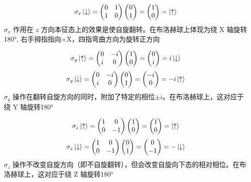 \[
\sigma_{x}\ket{\downarrow} = \begin{pmatrix}
	0 & 1 \\
	1 & 0
\end{pmatrix} \begin{pmatrix}
	0 \\
	1
\end{pmatrix} = \begin{pmatrix}
	1 \\
	0
\end{pmatrix} = \ket{\uparrow}
\]
$\sigma_{x}$ 作用在 $z$ 方向本征态上的效果是使自旋翻转。在布洛赫球上体现为绕 X 轴​旋转 180°, 右手拇指指向+X，四指弯曲方向为旋转正方向\par
\[
\sigma_{y}\ket{\uparrow} = \begin{pmatrix}0 & -i\\ i & 0\end{pmatrix}\begin{pmatrix}1\\0\end{pmatrix}=\begin{pmatrix}0\\ i\end{pmatrix}=i\ket{\downarrow}
\]
\[
\sigma_{y}\ket{\downarrow} = \begin{pmatrix}0 & -i\\ i & 0\end{pmatrix}\begin{pmatrix}0\\1\end{pmatrix}=\begin{pmatrix}-i\\0\end{pmatrix}=-i\ket{\uparrow}
\]
\(\sigma_y\) 操作在翻转自旋方向的同时，附加了特定的相位\(\pm i\)。在布洛赫球上，这对应于绕 Y 轴旋转180°

\[
\sigma_{z}\ket{\uparrow} = \begin{pmatrix}1 & 0\\0 & -1\end{pmatrix}\begin{pmatrix}1\\0\end{pmatrix}=\begin{pmatrix}1\\0\end{pmatrix}=\ket{\uparrow}
\]
\[
\sigma_{z}\ket{\downarrow} = \begin{pmatrix}1 & 0\\0 & -1\end{pmatrix}\begin{pmatrix}0\\1\end{pmatrix}=\begin{pmatrix}0\\-1\end{pmatrix}=-\ket{\downarrow}
\]
\(\sigma_z\) 操作不改变自旋方向（即不自旋翻转），但会改变自旋向下态的相对相位。在布洛赫球上，这对应于绕 Z 轴旋转180°

